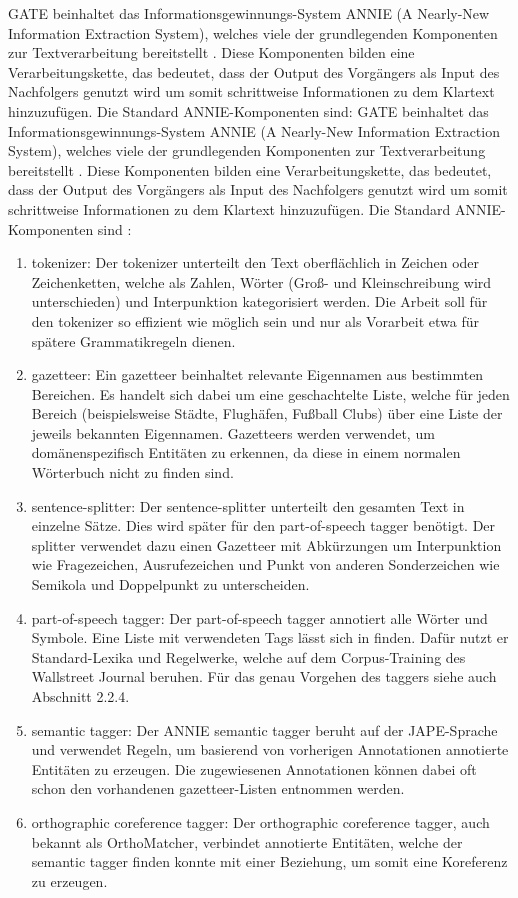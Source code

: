 \documentclass[12pt]{report}
\begin{document}
GATE beinhaltet das Informationsgewinnungs-System ANNIE (A Nearly-New Information Extraction System), welches viele der grundlegenden Komponenten zur Textverarbeitung bereitstellt \cite{go18}. Diese Komponenten bilden eine Verarbeitungskette, das bedeutet, dass der Output des Vorgängers als Input des Nachfolgers genutzt wird um somit schrittweise Informationen zu dem Klartext hinzuzufügen. Die Standard ANNIE-Komponenten sind:
GATE beinhaltet das Informationsgewinnungs-System ANNIE (A Nearly-New Information Extraction System), welches viele der grundlegenden Komponenten zur Textverarbeitung bereitstellt \cite{go18}. Diese Komponenten bilden eine Verarbeitungskette, das bedeutet, dass der Output des Vorgängers als Input des Nachfolgers genutzt wird um somit schrittweise Informationen zu dem Klartext hinzuzufügen. Die Standard ANNIE-Komponenten sind \cite{gm18}:
\begin{enumerate}
\item tokenizer: Der tokenizer unterteilt den Text oberflächlich in Zeichen oder Zeichenketten, welche als Zahlen, Wörter (Groß- und Kleinschreibung wird unterschieden) und Interpunktion kategorisiert werden. Die Arbeit soll für den tokenizer so effizient wie möglich sein und nur als Vorarbeit etwa für spätere Grammatikregeln dienen. 

\item gazetteer: Ein gazetteer beinhaltet relevante Eigennamen aus bestimmten Bereichen. Es handelt sich dabei um eine geschachtelte Liste, welche für jeden Bereich (beispielsweise Städte, Flughäfen, Fußball Clubs) über eine Liste der jeweils bekannten Eigennamen. Gazetteers werden verwendet, um domänenspezifisch Entitäten zu erkennen, da diese in einem normalen Wörterbuch nicht zu finden sind.

\item sentence-splitter: Der sentence-splitter unterteilt den gesamten Text in einzelne Sätze. Dies wird später für den part-of-speech tagger benötigt. Der splitter verwendet dazu einen Gazetteer mit Abkürzungen um Interpunktion wie Fragezeichen, Ausrufezeichen und Punkt von anderen Sonderzeichen wie Semikola und Doppelpunkt zu unterscheiden. 

\item part-of-speech tagger: Der part-of-speech tagger annotiert alle Wörter und Symbole. Eine Liste mit verwendeten Tags lässt sich in \cite{gt18} finden. Dafür nutzt er Standard-Lexika und Regelwerke, welche auf dem Corpus-Training des Wallstreet Journal beruhen. Für das genau Vorgehen des taggers siehe auch Abschnitt 2.2.4.

\item semantic tagger: Der ANNIE semantic tagger beruht auf der JAPE-Sprache und verwendet Regeln, um basierend von vorherigen Annotationen annotierte Entitäten zu erzeugen. Die zugewiesenen Annotationen können dabei oft schon den vorhandenen gazetteer-Listen entnommen werden. 

\item orthographic coreference tagger: Der orthographic coreference tagger, auch bekannt als OrthoMatcher, verbindet annotierte Entitäten, welche der semantic tagger finden konnte mit einer Beziehung, um somit eine Koreferenz zu erzeugen.
\end{enumerate}
\end{document}
